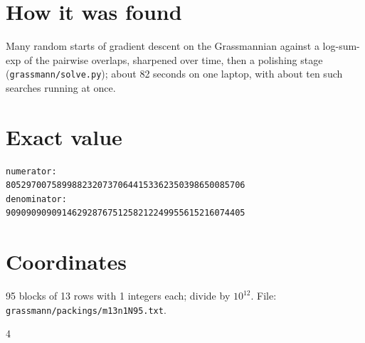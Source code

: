 \documentclass[11pt,a4paper]{article}
\begin{document}
\section{How it was found}
Many random starts of gradient descent on the Grassmannian against a log-sum-exp of the pairwise overlaps, sharpened over time, then a polishing stage (\texttt{grassmann/solve.py}); about 82 seconds on one laptop, with about ten such searches running at once.


\appendix
\section{Exact value}
{\small
\begin{verbatim}
numerator:
80529700758998823207370644153362350398650085706
denominator:
90909090909146292876751258212249955615216074405
\end{verbatim}}

\section{Coordinates}
95 blocks of 13 rows with 1 integers each; divide by $10^{12}$. File: \texttt{grassmann/packings/m13n1N95.txt}.
{\tiny
\begin{multicols}{4}
\end{multicols}}
\end{document}

